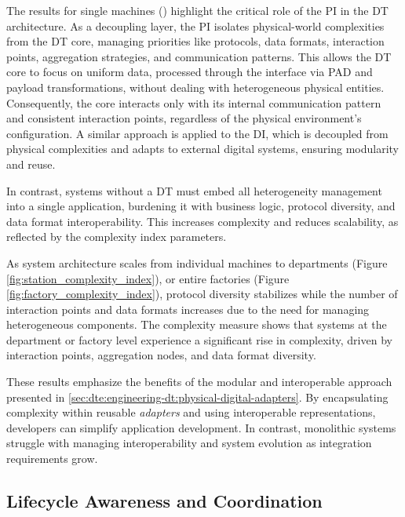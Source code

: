 The results for single machines () highlight the critical role of the \ac{PI} in the \ac{DT} architecture.
As a decoupling layer, the \ac{PI} isolates physical-world complexities from the DT core, managing priorities like protocols, data formats, interaction points, aggregation strategies, and communication patterns.
This allows the DT core to focus on uniform data, processed through the interface via \ac{PAD} and payload transformations, without dealing with heterogeneous physical entities.
%
Consequently, the core interacts only with its internal communication pattern and consistent interaction points, regardless of the physical environment's configuration.
A similar approach is applied to the \ac{DI}, which is decoupled from physical complexities and adapts to external digital systems, ensuring modularity and reuse.

In contrast, systems without a \ac{DT} must embed all heterogeneity management into a single application, burdening it with business logic, protocol diversity, and data format interoperability.
This increases complexity and reduces scalability, as reflected by the complexity index parameters.

As system architecture scales from individual machines to departments (Figure \ref{fig:station_complexity_index}), or entire factories (Figure \ref{fig:factory_complexity_index}), protocol diversity stabilizes while the number of interaction points and data formats increases due to the need for managing heterogeneous components.
The complexity measure shows that systems at the department or factory level experience a significant rise in complexity, driven by interaction points, aggregation nodes, and data format diversity.

These results emphasize the benefits of the modular and interoperable approach presented in \cref{sec:dte:engineering-dt:physical-digital-adapters}.
By encapsulating complexity within reusable \emph{adapters} and using interoperable representations, developers can simplify application development.
In contrast, monolithic systems struggle with managing interoperability and system evolution as integration requirements grow.

\subsection{Lifecycle Awareness and Coordination}

